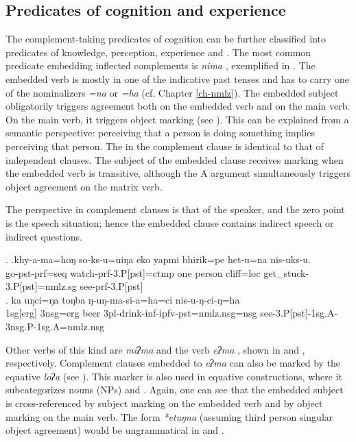 \subsection{Predicates of cognition and experience}\label{cognition-pred}

The complement-taking predicates of cognition can be further classified into predicates of knowledge, perception, experience and . 
 The most common predicate embedding inflected complements is \emph{nima} , exemplified in \Next. The embedded verb is mostly in one of the indicative past tenses and has to carry one of the nominalizers \emph{=na} or \emph{=ha} (cf. Chapter \ref{ch-nmlz}). The embedded subject obligatorily triggers agreement both on the embedded verb and on the main verb. On the main verb, it triggers object marking (see \Next[b]). This can be explained from a semantic perspective: perceiving that a person is doing something implies perceiving that person. The  in the complement clause is identical to that of independent clauses. The subject of the embedded clause receives   marking when the embedded verb is transitive, although the A argument simultaneously triggers object agreement on the matrix verb. 
 
 The perspective in complement clauses is that of the speaker, and the zero point is the speech situation; hence the embedded clause contains indirect speech or indirect questions.

\ex. \ag.khy-a-ma=hoŋ          so-ks-u=niŋa                 eko yapmi  bhirik=pe    het-u=na                      nis-uks-u.\\
go{\sc -pst-prf=seq}  watch{\sc -prf-3.P[pst]=ctmp} one person cliff{\sc =loc} get\_stuck{\sc -3.P[pst]=nmlz.sg} see{\sc -prf-3.P[pst]}\\
 
\bg. ka uŋci=ŋa toŋba ŋ-uŋ-ma-si-a=ha=ci nis-u-ŋ-ci-ŋ=ha\\
{\sc 1sg[erg]} {\sc 3nsg=erg} beer  {\sc 3pl}-drink-{\sc inf-ipfv-pst=nmlz.nsg=nsg} see{\sc -3.P[pst]-1sg.A-3nsg.P-1sg.A=nmlz.nsg}\\


Other verbs of this kind are  \emph{miʔma}  and the  verb \emph{eʔma} , shown in \Next and \NNext[a], respectively.  Complement clauses embedded to  \emph{eʔma} can also be marked by the equative   \emph{loʔa}  (see \NNext[b]). This marker is also used in equative constructions, where it subcategorizes nouns (NPs) and .  Again, one can see that the embedded subject is cross-referenced by subject marking on the embedded verb and by object marking on the main verb. The form \emph{*etuŋna} (assuming third person singular  object agreement) would be ungrammatical in \NNext[b] and \NNext[c]. 

